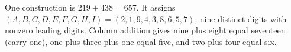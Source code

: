 One construction is $\boxed{219+438=657}$. It assigns $(A,B,C,D,E,F,G,H,I)=(2,1,9,4,3,8,6,5,7)$, nine distinct digits with nonzero leading digits. Column addition gives nine plus eight equal seventeen (carry one), one plus three plus one equal five, and two plus four equal six.
